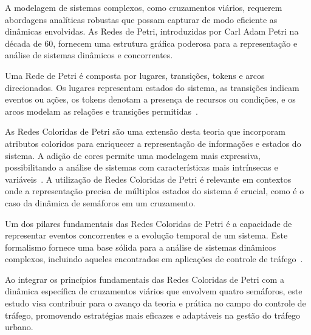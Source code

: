 A modelagem de sistemas complexos, como cruzamentos viários, requerem abordagens analíticas robustas que possam capturar de modo eficiente as dinâmicas envolvidas.
As Redes de Petri, introduzidas por Carl Adam Petri na década de 60, fornecem uma estrutura gráfica poderosa para a representação e análise de sistemas dinâmicos e concorrentes.

Uma Rede de Petri é composta por lugares, transições, tokens e arcos direcionados.
Os lugares representam estados do sistema, as transições indicam eventos ou ações, os tokens denotam a presença de recursos ou condições, e os arcos modelam as relações e transições permitidas~\cite{petri-nets-paper}.

As Redes Coloridas de Petri são uma extensão desta teoria que incorporam atributos coloridos para enriquecer a representação de informações e estados do sistema.
A adição de cores permite uma modelagem mais expressiva, possibilitando a análise de sistemas com características mais intrínsecas e variáveis~\cite{colored-petri-nets-book}.
A utilização de Redes Coloridas de Petri é relevante em contextos onde a representação precisa de múltiplos estados do sistema é crucial, como é o caso da dinâmica de semáforos em um cruzamento.

Um dos pilares fundamentais das Redes Coloridas de Petri é a capacidade de representar eventos concorrentes e a evolução temporal de um sistema.
Este formalismo fornece uma base sólida para a análise de sistemas dinâmicos complexos, incluindo aqueles encontrados em aplicações de controle de tráfego~\cite{petri-nets-applications-article}.

Ao integrar os princípios fundamentais das Redes Coloridas de Petri com a dinâmica específica de cruzamentos viários que envolvem quatro semáforos, este estudo visa contribuir para o avanço da teoria e prática no campo do controle de tráfego, promovendo estratégias mais eficazes e adaptáveis na gestão do tráfego urbano.